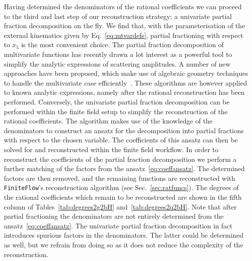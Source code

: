 \documentclass[main.tex]{subfiles}
\begin{document}
Having determined the denominators of the rational coefficients we can proceed to the third and last step of our reconstruction strategy:  a univariate partial fraction decomposition on the fly. We find that, with the parameterisation of the external kinematics given by Eq.~\eqref{eq:mtvardefs}, partial fractioning with respect to $x_5$ is the most convenient choice. 
The partial fraction decomposition of multivariate functions has recently drawn a lot interest as a powerful tool to simplify the analytic expressions of scattering amplitudes. A number of new approaches have been proposed, which make use of algebraic geometry techniques to handle the multivariate case efficiently~\cite{Leinartas:1978,Raichev:2012,Abreu:2019odu,Boehm:2020ijp,Heller:2021qkz}. These algorithms are however applied to known analytic expressions, namely after the rational reconstruction has been performed. Conversely, the univariate partial fraction decomposition can be performed within the finite field setup to simplify the reconstruction of the rational coefficients.
The algorithm makes use of the knowledge of the denominators to construct an ansatz for the decomposition into partial fractions with respect to the chosen variable. The coefficients of this ansatz can then be solved for and reconstructed within the finite field workflow. In order to reconstruct the coefficients of the partial fraction decomposition we perform a further matching of the factors from the ansatz~\eqref{eq:coeffansatz}. The determined factors are then removed, and the remaining functions are reconstructed with \texttt{FiniteFlow}'s reconstruction algorithm (see Sec.~\ref{sec:ratfuncs}). The degrees of the rational coefficients which remain to be reconstructed are shown in the fifth column of Tables~\ref{tab:degrees2g2bH} and~\ref{tab:degrees2q2bH}. Note that after partial fractioning the denominators are not entirely determined from the ansatz~\eqref{eq:coeffansatz}. The univariate partial fraction decomposition in fact introduces spurious factors in the denominators. The latter could be determined as well, but we refrain from doing so as it does not reduce the complexity of the reconstruction.
\end{document}
